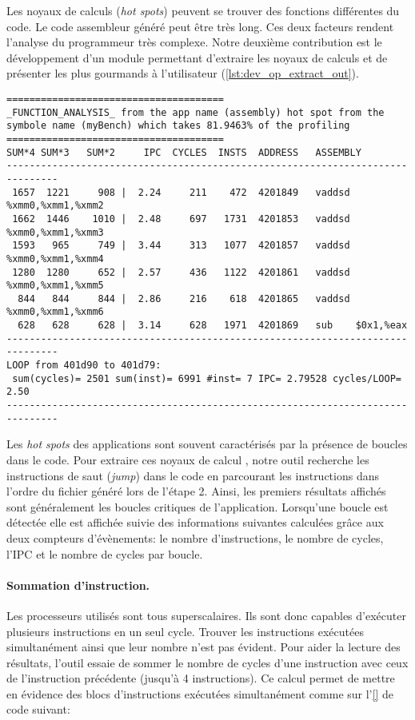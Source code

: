         Les noyaux de calculs (\textit{hot spots}) peuvent se trouver des fonctions différentes du code. Le code assembleur généré peut être très long. Ces deux facteurs rendent l'analyse du programmeur très complexe. Notre deuxième contribution est le développement d'un module permettant d'extraire les noyaux de calculs et de présenter les plus gourmands à l'utilisateur (\autoref{lst:dev_op_extract_out}).
      
\begin{lstlisting}[label=lst:dev_op_extract_out, caption=L'outil Oprofile++ permet de faire correspondre les adresses mémoires des deux fichiers.]
======================================
_FUNCTION_ANALYSIS_ from the app name (assembly) hot spot from the symbole name (myBench) which takes 81.9463% of the profiling
======================================
SUM*4 SUM*3   SUM*2     IPC  CYCLES  INSTS  ADDRESS   ASSEMBLY  
-------------------------------------------------------------------------------
 1657  1221     908 |  2.24     211    472  4201849   vaddsd %xmm0,%xmm1,%xmm2
 1662  1446    1010 |  2.48     697   1731  4201853   vaddsd %xmm0,%xmm1,%xmm3
 1593   965     749 |  3.44     313   1077  4201857   vaddsd %xmm0,%xmm1,%xmm4
 1280  1280     652 |  2.57     436   1122  4201861   vaddsd %xmm0,%xmm1,%xmm5
  844   844     844 |  2.86     216    618  4201865   vaddsd %xmm0,%xmm1,%xmm6
  628   628     628 |  3.14     628   1971  4201869   sub    $0x1,%eax
-------------------------------------------------------------------------------
LOOP from 401d90 to 401d79:
 sum(cycles)= 2501 sum(inst)= 6991 #inst= 7 IPC= 2.79528 cycles/LOOP= 2.50
-------------------------------------------------------------------------------
\end{lstlisting} 

        Les \textit{hot spots} des applications sont souvent caractérisés par la présence de boucles dans le code. Pour extraire ces noyaux de calcul , notre outil recherche les instructions de saut (\textit{jump}) dans le code en parcourant les instructions dans l'ordre du fichier généré lors de l'étape 2. Ainsi, les premiers résultats affichés sont généralement les boucles critiques de l'application. Lorsqu'une boucle est détectée elle est affichée suivie des informations suivantes calculées grâce aux deux compteurs d'évènements: le nombre d'instructions, le nombre de cycles, l'IPC et le nombre de cycles par boucle. 
        
        \paragraph{Sommation d'instruction.} Les processeurs utilisés sont tous superscalaires. Ils sont donc capables d'exécuter plusieurs instructions en un seul cycle. Trouver les instructions exécutées simultanément ainsi que leur nombre n'est pas évident. Pour aider la lecture des résultats, l'outil essaie de sommer le nombre de cycles d'une instruction avec ceux de l'instruction précédente (jusqu'à 4 instructions). Ce calcul permet de mettre en évidence des blocs d'instructions exécutées simultanément comme sur l'\autoref{} de code suivant:
        
